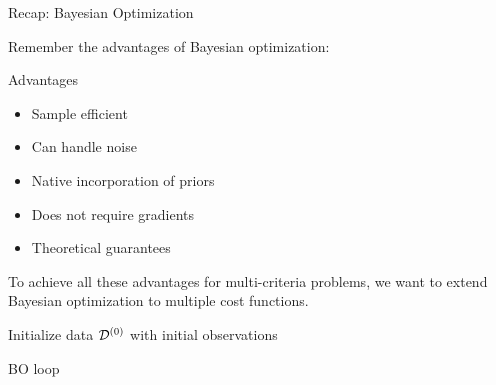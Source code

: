 \begin{frame}[allowframebreaks]{Recap: Bayesian Optimization}

Remember the advantages of Bayesian optimization:

\begin{block}{Advantages}
\begin{itemize}
  \item Sample efficient
  \item Can handle noise
  \item Native incorporation of priors
  \item Does not require gradients
  \item Theoretical guarantees
\end{itemize}
\end{block}

To achieve all these advantages for multi-criteria problems, we want to extend Bayesian optimization to multiple cost functions.

\framebreak

\begin{center}
\begin{minipage}{0.75\textwidth}
\begin{algorithm}[H]
    \setcounter{AlgoLine}{0}


	Initialize data $\iter[0]{\dataset}$ with initial observations\;%

    \For{$\bocount=1$ \KwTo $\bobudget$}{
		Fit predictive model $\iter[\bocount]{\surro}$ on $\iter[\bocount-1]{\dataset}$\;

		Select next query point: $\bonextsample \in \argmax_{\conf \in \pcs} \acq(\conf; \iter[\bocount-1]{\dataset}, \iter[\bocount]{\surro})$\;

		Query $\bonextobs$\;

		Update data: $\iter[\bocount]{\dataset} \leftarrow \iter[\bocount-1]{\dataset} \cup \{\langle \bonextsample, \bonextobs \rangle \}$\;
	}
	\caption*{BO loop}
\end{algorithm}
\end{minipage}
\end{center}
\end{frame}


